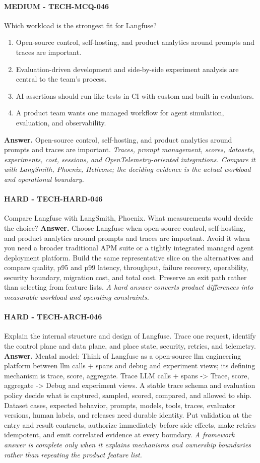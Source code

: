 \paragraph{MEDIUM - TECH-MCQ-046} Which workload is the strongest fit for Langfuse?
\begin{enumerate}[label=\Alph*.]
\item Open-source control, self-hosting, and product analytics around prompts and traces are important.
\item Evaluation-driven development and side-by-side experiment analysis are central to the team's process.
\item AI assertions should run like tests in CI with custom and built-in evaluators.
\item A product team wants one managed workflow for agent simulation, evaluation, and observability.
\end{enumerate}
\textbf{Answer.} Open-source control, self-hosting, and product analytics around prompts and traces are important.
\textit{Traces, prompt management, scores, datasets, experiments, cost, sessions, and OpenTelemetry-oriented integrations. Compare it with LangSmith, Phoenix, Helicone; the deciding evidence is the actual workload and operational boundary.}
\paragraph{HARD - TECH-HARD-046} Compare Langfuse with LangSmith, Phoenix. What measurements would decide the choice?
\textbf{Answer.} Choose Langfuse when open-source control, self-hosting, and product analytics around prompts and traces are important. Avoid it when you need a broader traditional APM suite or a tightly integrated managed agent deployment platform. Build the same representative slice on the alternatives and compare quality, p95 and p99 latency, throughput, failure recovery, operability, security boundary, migration cost, and total cost. Preserve an exit path rather than selecting from feature lists.
\textit{A hard answer converts product differences into measurable workload and operating constraints.}
\paragraph{HARD - TECH-ARCH-046} Explain the internal structure and design of Langfuse. Trace one request, identify the control plane and data plane, and place state, security, retries, and telemetry.
\textbf{Answer.} Mental model: Think of Langfuse as a open-source llm engineering platform between llm calls + spans and debug and experiment views; its defining mechanism is trace, score, aggregate. Trace LLM calls + spans -> Trace, score, aggregate -> Debug and experiment views. A stable trace schema and evaluation policy decide what is captured, sampled, scored, compared, and allowed to ship. Dataset cases, expected behavior, prompts, models, tools, traces, evaluator versions, human labels, and releases need durable identity. Put validation at the entry and result contracts, authorize immediately before side effects, make retries idempotent, and emit correlated evidence at every boundary.
\textit{A framework answer is complete only when it explains mechanisms and ownership boundaries rather than repeating the product feature list.}
